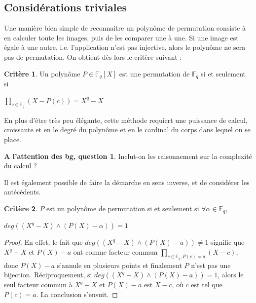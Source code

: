 \documentclass[12pt]{article}
\newcommand{\Fq}{\mathds{F}_q}
\theoremstyle{definition}
\newtheorem{crit}{Critère}
\newtheorem{bg}{A l'attention des bg, question}
\begin{document}
\subsection{Considérations triviales}
Une manière bien simple de reconnaitre un polynôme de permutation consiste à en calculer toute les images, puis de les comparer une à une. Si une image est égale à une autre, i.e. l'application n'est pas injective, alors le polynôme ne sera pas de permutation. On obtient dès lors le critère suivant :
\begin{crit}
Un polynôme $P \in \Fq[X]$ est une permutation de $\Fq$ si et seulement si \begin{center}$\displaystyle\prod_{c \in \Fq}(X-P(c)) = X^q -X$ \end{center}
\end{crit}
En plus d'être très peu élégante, cette méthode requiert une puissance de calcul, croissante et en le degré du polynôme et en le cardinal du corps dans lequel on se place. 

\begin{bg}
Inclut-on les raisonnement sur la complexité du calcul ?
\end{bg}

Il est également possible de faire la démarche en sens inverse, et de considérer les antécédents. %

\begin{crit}
$P$ est un polynôme de permutation si et seulement si $\forall \alpha \in \Fq$, 
\begin{center}$deg((X^q -X) \wedge (P(X)-\alpha)) = 1$\end{center}
\end{crit}

\begin{proof}
En effet, le fait que $deg((X^q -X) \wedge (P(X)-a)) \neq 1$ signifie que $X^q - X$ et $P(X) - a$ ont comme facteur commun $\displaystyle\prod_{c \in \Fq, P(c) = a}(X-c)$, donc $P(X) - a$ s'annule en plusieurs points et finalement $P$ n'est pas une bijection. \newline
Réciproquement, si $deg((X^q -X) \wedge (P(X)-a)) = 1$, alors le seul facteur commun à $X^q - X$ et $P(X) - a$ est $X-c$, où $c$ est tel que $P(c) = a$. La conclusion s'ensuit.
\end{proof}
\end{document}
